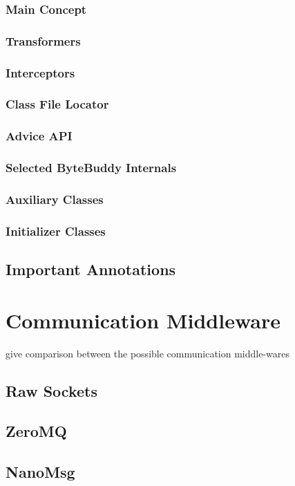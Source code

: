 \subsubsection{Main Concept}
\subsubsection{Transformers}
\subsubsection{Interceptors}
\subsubsection{Class File Locator}
\subsubsection{Advice API}
\subsubsection{Selected ByteBuddy Internals}
\subsubsection{Auxiliary Classes}
\subsubsection{Initializer Classes}
\subsection{Important Annotations}



\section{Communication Middleware}
give comparison between the possible communication middle-wares
\subsection{Raw Sockets}
\subsection{ZeroMQ}
\subsection{NanoMsg}
